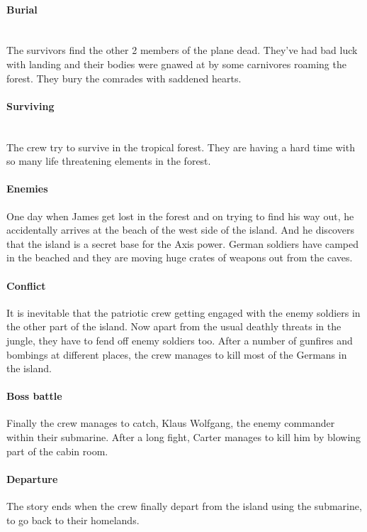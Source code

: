         \paragraph{\Large Burial}\mbox{}\\
            The survivors find the other 2 members of the plane dead. They've had bad luck
            with landing and their bodies were gnawed at by some carnivores roaming the forest. 
            They bury the comrades with saddened hearts. 
        \paragraph{\Large Surviving}\mbox{}\\
            The crew try to survive in the tropical forest. They are having a hard
            time with so many life threatening elements in the forest. 
        \paragraph{\Large Enemies}
            One day when James get lost in the forest and on trying to find his way
            out, he accidentally arrives at the beach of the west side of the island. 
            And he discovers that the island is a secret base for the Axis power.
            German soldiers have camped in the beached and they are moving huge crates 
            of weapons out from the caves.
        \paragraph{\Large Conflict}
            It is inevitable that the patriotic crew getting engaged with the enemy
            soldiers in the other part of the island. Now apart from the usual deathly
            threats in the jungle, they have to fend off enemy soldiers too. 
            After a number of gunfires and bombings at different places, the crew 
            manages to kill most of the Germans in the island. 
        \paragraph{\Large Boss battle}
            Finally the crew manages to catch, Klaus Wolfgang, the enemy commander 
            within their submarine. After a long fight, Carter manages to kill him 
            by blowing part of the cabin room. 
        \paragraph{\Large Departure}
            The story ends when the crew finally depart from the island using the
            submarine, to go back to their homelands. 
